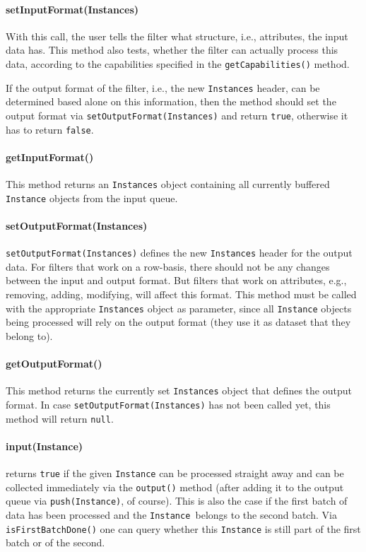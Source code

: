 \newpage
\paragraph{setInputFormat(Instances)}
With this call, the user tells the filter what structure, i.e., attributes, the
input data has. This method also tests, whether the filter can actually process
this data, according to the capabilities specified in the
\texttt{getCapabilities()} method.

If the output format of the filter, i.e., the new \texttt{Instances} header, can
be determined based alone on this information, then the method should set the
output format via \texttt{setOutputFormat(Instances)} and return \texttt{true},
otherwise it has to return \texttt{false}.

\paragraph{getInputFormat()}
This method returns an \texttt{Instances} object containing all currently
buffered \texttt{Instance} objects from the input queue.

\paragraph{setOutputFormat(Instances)}
\texttt{setOutputFormat(Instances)} defines the new \texttt{Instances} header
for the output data. For filters that work on a row-basis, there should not be
any changes between the input and output format. But filters that work on
attributes, e.g., removing, adding, modifying, will affect this format. This
method must be called with the appropriate \texttt{Instances} object as
parameter, since all \texttt{Instance} objects being processed will rely on the
output format (they use it as dataset that they belong to).

\paragraph{getOutputFormat()}
This method returns the currently set \texttt{Instances} object that defines the
output format. In case \texttt{setOutputFormat(Instances)} has not been called
yet, this method will return \texttt{null}.

\paragraph{input(Instance)} returns \texttt{true} if the given
\texttt{Instance} can be processed straight away and can be collected
immediately via the \texttt{output()} method (after adding it to the output
queue via \texttt{push(Instance)}, of course). This is also the case if the
first batch of data has been processed and the \texttt{Instance }belongs to the
second batch. Via \texttt{isFirstBatchDone()} one can query whether this
\texttt{Instance} is still part of the first batch or of the second.


